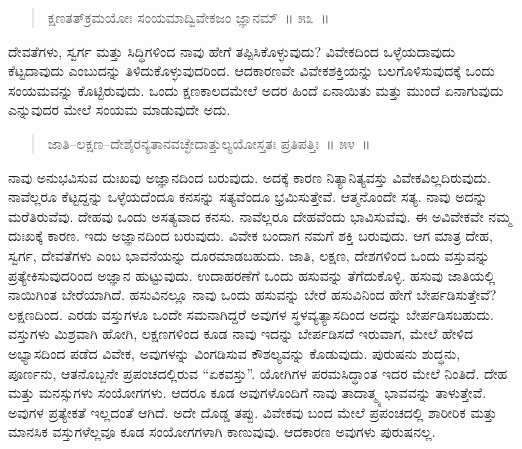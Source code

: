 \vspace{-0.3cm}

\begin{verse}
ಕ್ಷಣತತ್​ಕ್ರಮಯೋಃ ಸಂಯಮಾದ್ವಿವೇಕಜಂ ಜ್ಞಾನಮ್​~॥ ೫೩~॥
\end{verse}

\vspace{-0.4cm}


\vspace{0.1cm}

ದೇವತೆಗಳು, ಸ್ವರ್ಗ ಮತ್ತು ಸಿದ್ಧಿಗಳಿಂದ ನಾವು ಹೇಗೆ ತಪ್ಪಿಸಿಕೊಳ್ಳುವುದು? ವಿವೇಕದಿಂದ ಒಳ್ಳೆಯದಾವುದು ಕೆಟ್ಟದಾವುದು ಎಂಬುದನ್ನು ತಿಳಿದುಕೊಳ್ಳುವುದರಿಂದ. ಆದಕಾರಣವೇ ವಿವೇಕಶಕ್ತಿಯನ್ನು ಬಲಗೊಳಿಸುವುದಕ್ಕೆ ಒಂದು ಸಂಯಮವನ್ನು ಕೊಟ್ಟಿರುವುದು. ಒಂದು ಕ್ಷಣಕಾಲದಮೇಲೆ ಅದರ ಹಿಂದೆ ಏನಾಯಿತು ಮತ್ತು ಮುಂದೆ ಏನಾಗುವುದು ಎನ್ನುವುದರ ಮೇಲೆ ಸಂಯಮ ಮಾಡುವುದೇ ಅದು. 

\vspace{-0.3cm}

\begin{verse}
ಜಾತಿ–ಲಕ್ಷಣ–ದೇಶೈರನ್ಯತಾನವಚ್ಛೇದಾತ್ತುಲ್ಯಯೋಸ್ತತಃ ಪ್ರತಿಪತ್ತಿಃ~॥ ೫೪~॥
\end{verse}

\vspace{-0.4cm}


\vspace{0.1cm}

ನಾವು ಅನುಭವಿಸುವ ದುಃಖವು ಅಜ್ಞಾನದಿಂದ ಬರುವುದು. ಅದಕ್ಕೆ ಕಾರಣ ನಿತ್ಯಾನಿತ್ಯವಸ್ತು ವಿವೇಕವಿಲ್ಲದಿರುವುದು. ನಾವೆಲ್ಲರೂ ಕೆಟ್ಟದ್ದನ್ನು ಒಳ್ಳೆಯದೆಂದೂ ಕನಸನ್ನು ಸತ್ಯವೆಂದೂ ಭ್ರಮಿಸುತ್ತೇವೆ. ಆತ್ಮನೊಂದೇ ಸತ್ಯ. ನಾವು ಅದನ್ನು ಮರೆತಿರುವೆವು. ದೇಹವು ಒಂದು ಅಸತ್ಯವಾದ ಕನಸು. ನಾವೆಲ್ಲರೂ ದೇಹವೆಂದು ಭಾವಿಸುವೆವು. ಈ ಅವಿವೇಕವೇ ನಮ್ಮ ದುಃಖಕ್ಕೆ ಕಾರಣ. ಇದು ಅಜ್ಞಾನದಿಂದ ಬರುವುದು. ವಿವೇಕ ಬಂದಾಗ ನಮಗೆ ಶಕ್ತಿ ಬರುವುದು. ಆಗ ಮಾತ್ರ ದೇಹ, ಸ್ವರ್ಗ, ದೇವತೆಗಳು ಎಂಬ ಭಾವನೆಯನ್ನು ದೂರಮಾಡಬಹುದು. ಜಾತಿ, ಲಕ್ಷಣ, ದೇಶಗಳಿಂದ ಒಂದು ವಸ್ತುವನ್ನು ಪ್ರತ್ಯೇಕಿಸುವುದರಿಂದ ಅಜ್ಞಾನ ಹುಟ್ಟುವುದು. ಉದಾಹರಣೆಗೆ ಒಂದು ಹಸುವನ್ನು ತೆಗೆದುಕೊಳ್ಳಿ. ಹಸುವು ಜಾತಿಯಲ್ಲಿ ನಾಯಿಗಿಂತ ಬೇರೆಯಾಗಿದೆ. ಹಸುವಿನಲ್ಲೂ ನಾವು ಒಂದು ಹಸುವನ್ನು ಬೇರೆ ಹಸುವಿನಿಂದ ಹೇಗೆ ಬೇರ್ಪಡಿಸುತ್ತೇವೆ? ಲಕ್ಷಣದಿಂದ. ಎರಡು ವಸ್ತುಗಳೂ ಒಂದೇ ಸಮನಾಗಿದ್ದರೆ ಅವುಗಳ ಸ್ಥಳವ್ಯತ್ಯಾಸದಿಂದ ಅದನ್ನು ಬೇರ್ಪಡಿಸಬಹುದು. ವಸ್ತುಗಳು ಮಿಶ್ರವಾಗಿ ಹೋಗಿ, ಲಕ್ಷಣಗಳಿಂದ ಕೂಡ ನಾವು ಇದನ್ನು ಬೇರ್ಪಡಿಸದೆ ಇರುವಾಗ, ಮೇಲೆ ಹೇಳಿದ ಅಭ್ಯಾಸದಿಂದ ಪಡೆದ ವಿವೇಕ, ಅವುಗಳನ್ನು ವಿಂಗಡಿಸುವ ಕೌಶಲ್ಯವನ್ನು ಕೊಡುವುದು. ಪುರುಷನು ಶುದ್ಧನು, ಪೂರ್ಣನು, ಆತನೊಬ್ಬನೇ ಪ್ರಪಂಚದಲ್ಲಿರುವ “ಏಕವಸ್ತು”. ಯೋಗಿಗಳ ಪರಮಸಿದ್ಧಾಂತ ಇದರ ಮೇಲೆ ನಿಂತಿದೆ. ದೇಹ ಮತ್ತು ಮನಸ್ಸುಗಳು ಸಂಯೋಗಗಳು. ಆದರೂ ಕೂಡ ಅವುಗಳೊಂದಿಗೆ ನಾವು ತಾದಾತ್ಮ್ಯ ಭಾವವನ್ನು ತಾಳುತ್ತೇವೆ. ಅವುಗಳ ಪ್ರತ್ಯೇಕತೆ ಇಲ್ಲದಂತೆ ಆಗಿದೆ. ಅದೇ ದೊಡ್ಡ ತಪ್ಪು. ವಿವೇಕವು ಬಂದ ಮೇಲೆ ಪ್ರಪಂಚದಲ್ಲಿ ಶಾರೀರಿಕ ಮತ್ತು ಮಾನಸಿಕ ವಸ್ತುಗಳೆಲ್ಲವೂ ಕೂಡ ಸಂಯೋಗಗಳಾಗಿ ಕಾಣುವುವು. ಆದಕಾರಣ ಅವುಗಳು ಪುರುಷನಲ್ಲ. 

